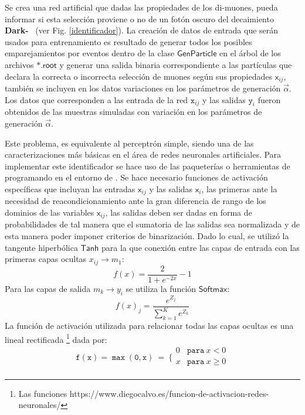 Se crea una red artificial que dadas las propiedades de los di-muones, pueda informar si esta selección proviene o no de un fotón oscuro del decaimiento \textbf{Dark-}\SUSY%
~(ver Fig. \ref{identificador}). La creación de datos de entrada que serán usados para entrenamiento es resultado de generar todos los posibles emparejamientos por eventos dentro de la clase $\textsf{GenParticle}$ en el árbol de los archivos $\textsf{*.root}$ y generar una salida binaria correspondiente a las partículas que declara la correcta o incorrecta selección de muones según sus propiedades $\textsf{x}_{ij}$, también se incluyen en los datos variaciones en los parámetros de generación $\vec{\alpha}$. Los datos que corresponden a las entrada de la red $\mathtt{x}_{ij}$ y las salidas $\mathtt{y}_i$ fueron obtenidos de las muestras simuladas con variación en los parámetros de generación $\vec{\alpha}$. 


Este problema, es equivalente al perceptrón simple, siendo una de las caracterizaciones más básicas en el área de redes neuronales artificiales. Para implementar este identificador se hace uso de las paqueterías o herramientas de  programando en el entorno de . Se hace necesario funciones de activación específicas que incluyan las entradas $\textsf{x}_{ij}$ y las salidas $\textsf{x}_i$, las primeras ante la necesidad de reacondicionamiento ante la gran diferencia de rango de los dominios de las variables $\textsf{x}_{ij}$, las salidas deben ser dadas en forma de probabilidades de tal manera que el sumatoria de las salidas sea normalizada y de esta manera poder imponer criterios de binarización. Dado lo cual, se utilizó la tangente hiperbólica $\textsf{Tanh}$ para la que conexión entre las capas de entrada con las primeras capas ocultas $x_{ij} \longrightarrow m_1$:
\begin{equation}
f(x)=\dfrac{2}{1+e^{-2x}}-1
\end{equation}
Para las capas de salida $m_k \longrightarrow y_i$ se utiliza la función $\textsf{Softmax}$:
\begin{equation}
f(x)_j = \dfrac{e^{Z_j}}{\sum_{k=1}^{K}e^{Z_k}}
\end{equation}
La función de activación utilizada para relacionar todas las capas ocultas es una lineal rectificada  \footnote{Las funciones https://www.diegocalvo.es/funcion-de-activacion-redes-neuronales/} dada por:
\begin{equation}\label{relu}
\mathtt{f(x)=\max (0,x)} ~ = ~ \Bigg\{\begin{matrix}
0 & \mathtt{para }~ x<0\\
x & \mathtt{para }~ x\geq 0\\
\end{matrix} 
\end{equation}

